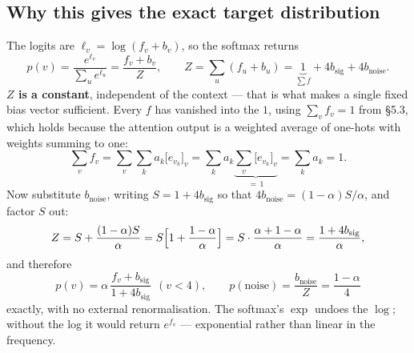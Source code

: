 \documentclass[11pt]{article}
\begin{document}
\subsection{Why this gives the exact target distribution}
The logits are $\ell_v=\log(f_v+b_v)$, so the softmax returns
\begin{equation}
p(v)=\frac{e^{\ell_v}}{\sum_u e^{\ell_u}}=\frac{f_v+b_v}{Z},
\qquad
Z=\sum_{u}(f_u+b_u)=\underbrace{1}_{\sum f}+4b_{\mathrm{sig}}+4b_{\mathrm{noise}} .
\end{equation}
\textbf{$Z$ is a constant}, independent of the context --- that is what makes a single fixed bias
vector sufficient. Every $f$ has vanished into the $1$, using $\sum_v f_v=1$ from \S5.3, which
holds because the attention output is a weighted average of one-hots with weights summing to one:
\begin{equation}
\sum_v f_v=\sum_v\sum_k a_k\bigl[e_{v_k}\bigr]_v=\sum_k a_k\underbrace{\sum_v\bigl[e_{v_k}\bigr]_v}_{=\,1}
=\sum_k a_k=1 .
\end{equation}
Now substitute $b_{\mathrm{noise}}$, writing $S=1+4b_{\mathrm{sig}}$ so that
$4b_{\mathrm{noise}}=(1-\alpha)S/\alpha$, and factor $S$ out:
\begin{equation}
Z=S+\frac{(1-\alpha)S}{\alpha}
 =S\Bigl[1+\frac{1-\alpha}{\alpha}\Bigr]
 =S\cdot\frac{\alpha+1-\alpha}{\alpha}
 =\frac{1+4b_{\mathrm{sig}}}{\alpha},
\end{equation}
and therefore
\begin{equation}
\boxed{\;p(v)=\alpha\,\frac{f_v+b_{\mathrm{sig}}}{1+4b_{\mathrm{sig}}}\ \ (v<4),
\qquad
p(\mathrm{noise})=\frac{b_{\mathrm{noise}}}{Z}=\frac{1-\alpha}{4}\;}
\end{equation}
exactly, with no external renormalisation. The softmax's $\exp$ undoes the $\log$; without the
log it would return $e^{f_v}$ --- exponential rather than linear in the frequency.
\end{document}
